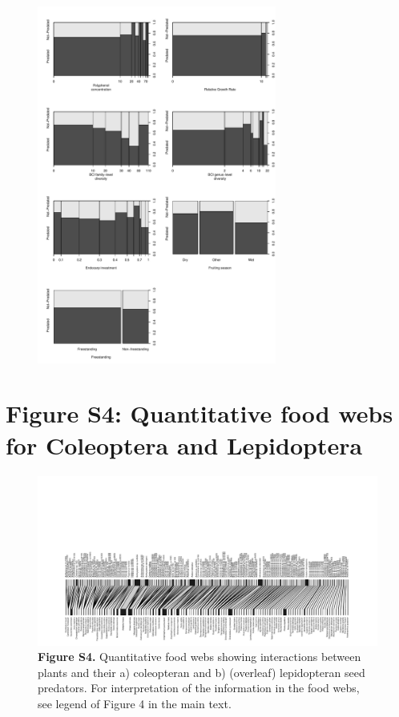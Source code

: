 \documentclass[11pt]{article}
\begin{document}
\begin{figure}[H]
\centering\includegraphics[width=0.7\textwidth]{../Figures/SpinePlotsb.pdf} 
\end{figure}

\newpage


\section{Figure S4: Quantitative food webs for Coleoptera and Lepidoptera}

\begin{figure}[H]
\caption[]{\textbf{Figure S4.} Quantitative food webs showing interactions between plants and their a) coleopteran and b) (overleaf) lepidopteran seed predators. For interpretation of the information in the food webs, see legend of Figure 4 in the main text.  }
\centering\includegraphics[width=1.2\textwidth, angle = 270, origin=c]{../Figures/FigureS4Coleoptera.pdf} 
\end{figure}
\end{document}
